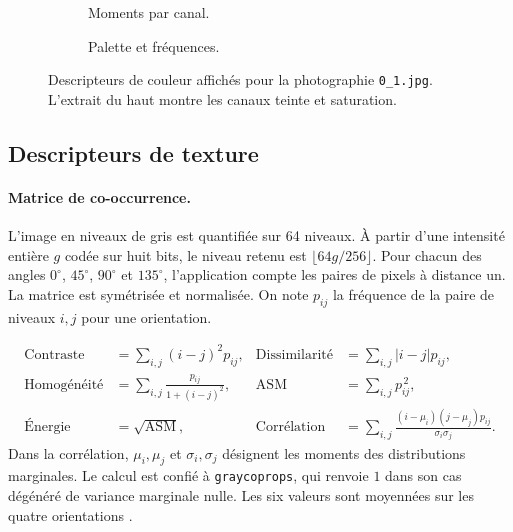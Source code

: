 \begin{figure}[ht]
  \centering
  \par\smallskip
  \begin{subfigure}[t]{0.49\linewidth}
    \centering
    \caption{Moments par canal.}
  \end{subfigure}\hfill
  \begin{subfigure}[t]{0.49\linewidth}
    \centering
    \caption{Palette et fréquences.}
  \end{subfigure}
  \caption{Descripteurs de couleur affichés pour la photographie \texttt{0\_1.jpg}. L'extrait du haut montre les canaux teinte et saturation.}
  \label{fig:couleurs}
\end{figure}

\clearpage
\subsection{Descripteurs de texture}
\paragraph{Matrice de co-occurrence.}
L'image en niveaux de gris est quantifiée sur 64 niveaux. À partir d'une intensité entière \(g\) codée sur huit bits, le niveau retenu est \(\lfloor 64 g/256\rfloor\). Pour chacun des angles \(0^\circ\), \(45^\circ\), \(90^\circ\) et \(135^\circ\), l'application compte les paires de pixels à distance un. La matrice est symétrisée et normalisée. On note \(p_{ij}\) la fréquence de la paire de niveaux \(i,j\) pour une orientation.

\begin{align}
  \mathrm{Contraste} &= \sum_{i,j}(i-j)^2p_{ij}, &
  \mathrm{Dissimilarité} &= \sum_{i,j}|i-j|p_{ij},
  \label{eq:glcm-contraste}\\
  \mathrm{Homogénéité} &= \sum_{i,j}\frac{p_{ij}}{1+(i-j)^2}, &
  \mathrm{ASM} &= \sum_{i,j}p_{ij}^{\,2},
  \label{eq:glcm-homogeneite}\\
  \mathrm{Énergie} &= \sqrt{\mathrm{ASM}}, &
  \mathrm{Corrélation} &= \sum_{i,j}
     \frac{(i-\mu_i)(j-\mu_j)p_{ij}}{\sigma_i\sigma_j}.
  \label{eq:glcm-energie}
\end{align}
Dans la corrélation, \(\mu_i,\mu_j\) et \(\sigma_i,\sigma_j\) désignent les moments des distributions marginales. Le calcul est confié à \texttt{graycoprops}, qui renvoie \(1\) dans son cas dégénéré de variance marginale nulle. Les six valeurs sont moyennées sur les quatre orientations \cite{skimage}.

